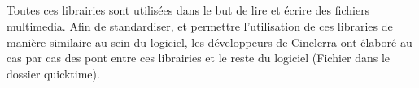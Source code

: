 \subparagraph{}

Toutes ces librairies sont utilisées dans le but de lire et écrire des
fichiers multimedia. Afin de standardiser, et permettre l'utilisation de
ces libraries de manière similaire au sein du logiciel, les développeurs
de Cinelerra ont élaboré au cas par cas des pont entre ces librairies
et le reste du logiciel (Fichier dans le dossier quicktime).

\subparagraph{}







